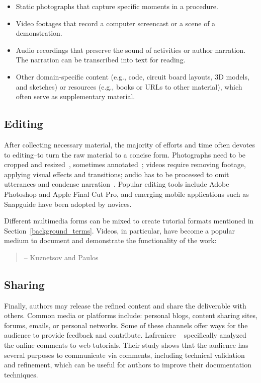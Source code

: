 \begin{itemize}
  \item Static photographs that capture specific moments in a procedure.
  \item Video footages that record a computer screencast or a scene of a demonstration.
  \item Audio recordings that preserve the sound of activities or author narration. The narration can be transcribed into text for reading.
  \item Other domain-specific content (e.g., code, circuit board layouts, 3D models, and sketches) or resources (e.g., books or URLs to other material), which often serve as supplementary material.
\end{itemize}

\subsection{Editing}
After collecting necessary material, the majority of efforts and time often devotes to editing--to turn the raw material to a concise form.
Photographs need to be cropped and resized~\cite{Tseng:2014:PVP:2598510.2598540}, sometimes annotated~\cite{Torrey:2007he}; videos require removing footage, applying visual effects and transitions; audio has to be processed to omit utterances and condense narration~\cite{Chi:2013:DGC:2501988.2502052}. Popular editing tools include Adobe Photoshop and Apple Final Cut Pro, and emerging mobile applications such as Snapguide have been adopted by novices.

Different multimedia forms can be mixed to create tutorial formats mentioned in Section~\ref{background_terms}. Videos, in particular, have become a popular medium to document and demonstrate the functionality of the work:

\begin{quote}
 -- Kuznetsov and Paulos~\cite{Kuznetsov:2010:REA:1868914.1868950}
\end{quote}

\subsection{Sharing}
Finally, authors may release the refined content and share the deliverable with others. Common media or platforms include: personal blogs, content sharing sites, forums, emails, or personal networks.
%
Some of these channels offer ways for the audience to provide feedback and contribute. Lafreniere \ea{}~\cite{Lafreniere:2012tl} specifically analyzed the online comments to web tutorials. Their study shows that the audience has several purposes to communicate via comments, including technical validation and refinement, which can be useful for authors to improve their documentation techniques.

